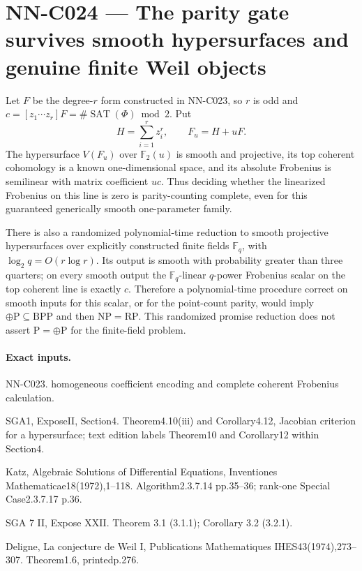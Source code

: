 \section{NN-C024 --- The parity gate survives smooth hypersurfaces and genuine finite Weil objects}
\begin{proposition}[NN-C024]
Let $F$ be the degree-$r$ form constructed in NN-C023, so $r$ is odd and $c=[z_1\cdots z_r]F=\#\operatorname{SAT}(\Phi)\bmod2$. Put
\[
 H=\sum_{i=1}^r z_i^r,\qquad F_u=H+uF.
\]
The hypersurface $V(F_u)$ over $\mathbb F_2(u)$ is smooth and projective, its top coherent cohomology is a known one-dimensional space, and its absolute Frobenius is semilinear with matrix coefficient $uc$. Thus deciding whether the linearized Frobenius on this line is zero is parity-counting complete, even for this guaranteed generically smooth one-parameter family.

There is also a randomized polynomial-time reduction to smooth projective hypersurfaces over explicitly constructed finite fields $\mathbb F_q$, with $\log_2q=O(r\log r)$. Its output is smooth with probability greater than three quarters; on every smooth output the $\mathbb F_q$-linear $q$-power Frobenius scalar on the top coherent line is exactly $c$. Therefore a polynomial-time procedure correct on smooth inputs for this scalar, or for the point-count parity, would imply $\oplus\mathrm P\subseteq\mathrm{BPP}$ and then $\mathrm{NP}=\mathrm{RP}$. This randomized promise reduction does not assert $\mathrm P=\oplus\mathrm P$ for the finite-field problem.
\end{proposition}
\paragraph{Exact inputs.}
NN-C023. homogeneous coefficient encoding and complete coherent Frobenius calculation.

SGA1, ExposeII, Section4. Theorem4.10(iii) and Corollary4.12, Jacobian criterion for a hypersurface; text edition labels Theorem10 and Corollary12 within Section4.

Katz, Algebraic Solutions of Differential Equations, Inventiones Mathematicae18(1972),1--118. Algorithm2.3.7.14 pp.35--36; rank-one Special Case2.3.7.17 p.36.

SGA 7 II, Expose XXII. Theorem 3.1 (3.1.1); Corollary 3.2 (3.2.1).

Deligne, La conjecture de Weil I, Publications Mathematiques IHES43(1974),273--307. Theorem1.6, printedp.276.

